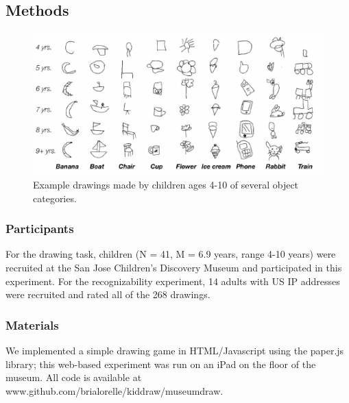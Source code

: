 \documentclass[10pt, letterpaper]{article}
\newenvironment{CodeChunk}{}{}
\begin{document}
\subsection{Methods}\label{methods}

\begin{CodeChunk}
\begin{figure}[h]

{\centering \includegraphics[width=1\linewidth]{figs/exampleDrawings-1} 

}

\caption[Example drawings made by children ages 4-10 of several object  categories]{Example drawings made by children ages 4-10 of several object  categories.}\label{fig:exampleDrawings}
\end{figure}
\end{CodeChunk}

\subsubsection{Participants}\label{participants}

For the drawing task, children (N = 41, M = 6.9 years, range 4-10 years)
were recruited at the San Jose Children's Discovery Museum and
participated in this experiment. For the recognizability experiment, 14
adults with US IP addresses were recruited and rated all of the 268
drawings.

\subsubsection{Materials}\label{materials}

We implemented a simple drawing game in HTML/Javascript using the
paper.js library; this web-based experiment was run on an iPad on the
floor of the museum. All code is available at
www.github.com/brialorelle/kiddraw/museumdraw.
\end{document}
